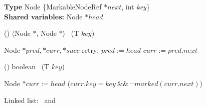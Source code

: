 

\begin{figure}[!t]
	\removelatexerror

\begin{algorithm}[H]

	\footnotesize

	\begin{flushleft}	
	\textbf{Type} Node \{MarkableNodeRef $*next$, int \emph{key}\}\\
	\textbf{Shared variables:} Node $*head$ \\	
	\end{flushleft}	


	\begin{procedure}[H]
  		\caption{() $\langle$Node $*$, Node $*$$\rangle$ \search\ (T $key$)}

		Node $*pred, *curr, *succ$ \;
		retry: \While{\True} { \label{find-outer-loop}
			$pred := head$ \;
			$curr := pred.next$ \label{search-read-cur}\;	
		}
	\end{procedure}


	\begin{procedure}[H]
  		\caption{() boolean \find\ (T $key$)}

		Node $*curr := head$ \label{linked-list-find-start} \;
		\KwRet ($curr.key = key\ \&\&\ \neg marked(curr.next)$) \label{linked-list-find-end}
	\end{procedure}

\caption{Linked list: \search\ and \find} \label{alg:linked-list}
\end{algorithm}

\end{figure}





